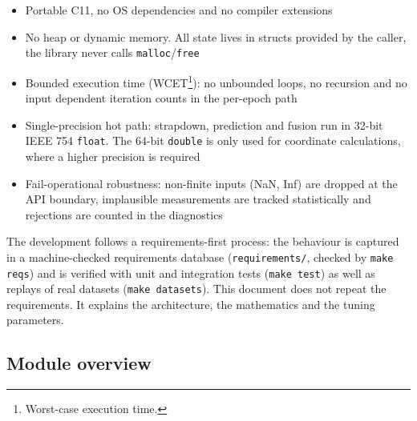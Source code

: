 \documentclass[11pt,a4paper]{article}
\newcommand{\code}[1]{\texttt{#1}}
\begin{document}
\begin{itemize}
  \item Portable C11, no OS dependencies and no compiler extensions
  \item No heap or dynamic memory. All state lives in structs provided by the
        caller, the library never calls \code{malloc}/\code{free}
  \item Bounded execution time (WCET\footnote{Worst-case execution time.}): no unbounded loops, no recursion and no
        input dependent iteration counts in the per-epoch path
  \item Single-precision hot path: strapdown, prediction and fusion run in
        32-bit IEEE 754 \code{float}. The 64-bit \code{double} is only used for
        coordinate calculations, where a higher precision is required
  \item Fail-operational robustness: non-finite inputs (NaN, Inf) are dropped
        at the API boundary, implausible measurements are tracked statistically
        and rejections are counted in the diagnostics
\end{itemize}

The development follows a requirements-first process: the behaviour is captured
in a machine-checked requirements database (\code{requirements/}, checked by
\code{make reqs}) and is verified with unit and integration tests
(\code{make test}) as well as replays of real datasets (\code{make datasets}).
This document does not repeat the requirements. It explains the architecture,
the mathematics and the tuning parameters.

\subsection{Module overview}
\end{document}
